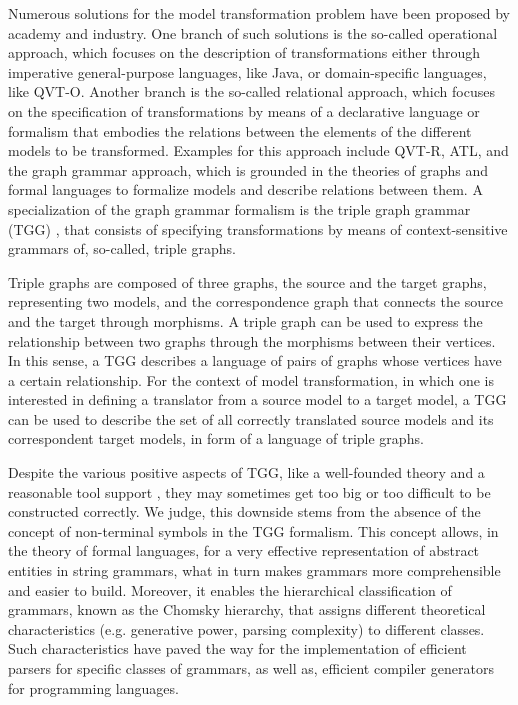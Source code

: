 Numerous solutions for the model transformation problem have been proposed by academy and industry. One branch of such solutions is the so-called operational approach, which focuses on the description of transformations either through imperative general-purpose languages, like Java, or domain-specific languages, like QVT-O. Another branch is the so-called relational approach, which focuses on the specification of transformations by means of a declarative language or formalism that embodies the relations between the elements of the different models to be transformed. Examples for this approach include QVT-R, ATL, and the graph grammar approach, which is grounded in the theories of graphs and formal languages to formalize models and describe relations between them. A specialization of the graph grammar formalism is the triple graph grammar (TGG) \cite{schurr1994specification}, that consists of specifying transformations by means of context-sensitive grammars of, so-called, triple graphs.

Triple graphs are composed of three graphs, the source and the target graphs, representing two models, and the correspondence graph that connects the source and the target through morphisms. A triple graph can be used to express the relationship between two graphs through the morphisms between their vertices. In this sense, a TGG describes a language of pairs of graphs whose vertices have a certain relationship. For the context of model transformation, in which one is interested in defining a translator from a source model to a target model, a TGG can be used to describe the set of all correctly translated source models and its correspondent target models, in form of a language of triple graphs.

Despite the various positive aspects of TGG, like a well-founded theory and a reasonable tool support \cite{anjorin201620}, they may sometimes get too big or too difficult to be constructed correctly. We judge, this downside stems from the absence of the concept of non-terminal symbols in the TGG formalism. This concept allows, in the theory of formal languages, for a very effective representation of abstract entities in string grammars, what in turn makes grammars more comprehensible and easier to build. Moreover, it enables the hierarchical classification of grammars, known as the Chomsky hierarchy, that assigns different theoretical characteristics (e.g. generative power, parsing complexity) to different classes. Such characteristics have paved the way for the implementation of efficient parsers for specific classes of grammars, as well as, efficient compiler generators for programming languages.

